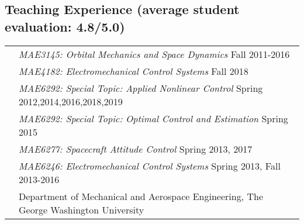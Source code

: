 \documentclass[10pt]{article}
\begin{document}
\vspace*{0.2cm}

\setlength{\tabcolsep}{0cm}
\subsection*{Teaching Experience \textnormal{\normalsize (average student evaluation: 4.8/5.0)}}
\begin{tabularx}{\textwidth}{>{\setlength{\hsize}{0.5cm}}X%
X}
&\textit{MAE3145: Orbital Mechanics and Space Dynamics} \hfill Fall 2011-2016\\
&\textit{MAE4182: Electromechanical Control Systems} \hfill Fall 2018\\
&\textit{MAE6292: Special Topic: Applied Nonlinear Control} \hfill Spring 2012,2014,2016,2018,2019\\
&\textit{MAE6292: Special Topic: Optimal Control and Estimation} \hfill Spring 2015\\
&\textit{MAE6277: Spacecraft Attitude Control} \hfill Spring 2013, 2017\\
&\textit{MAE6246: Electromechanical Control Systems} \hfill Spring 2013, Fall 2013-2016\\
&Department of Mechanical and Aerospace Engineering, The George Washington University\vspace*{0.30cm}\\


\end{tabularx}
\end{document}

